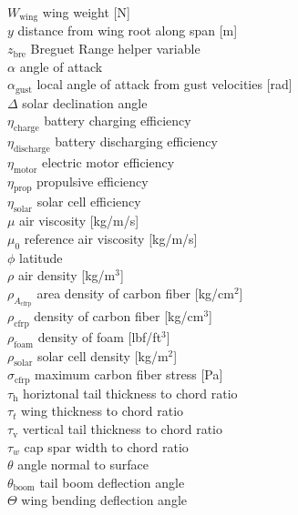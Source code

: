 \documentclass[]{aiaa-tc}%
\begin{document}
\begin{multicols}{2}
\begin{tabbing}
$W_{\text{wing}}$ \> wing weight [N] \\
$y$ \> distance from wing root along span [m] \\
$z_{\text{bre}}$ \> Breguet Range helper variable \\
$\alpha$ \> angle of attack \\
$\alpha_{\text{gust}}$ \> local angle of attack from gust velocities [rad] \\
$\Delta$ \> solar declination angle \\
$\eta_{\text{charge}}$ \> battery charging efficiency \\
$\eta_{\text{discharge}}$ \> battery discharging efficiency \\
$\eta_{\text{motor}}$ \> electric motor efficiency \\
$\eta_{\text{prop}}$ \> propulsive efficiency \\
$\eta_{\text{solar}}$ \> solar cell efficiency \\
$\mu$ \> air viscosity [kg/m/s] \\
$\mu_0$ \> reference air viscosity [kg/m/s] \\
$\phi$ \> latitude \\
$\rho$ \> air density [kg/m$^3$] \\
$\rho_{A_{\text{cfrp}}}$ \> area density of carbon fiber [kg/cm$^2$] \\
$\rho_{\text{cfrp}}$ \> density of carbon fiber [kg/cm$^3$] \\
$\rho_{\text{foam}}$ \> density of foam [lbf/ft$^3$] \\
$\rho_{\text{solar}}$ \> solar cell density [kg/m$^2$] \\
$\sigma_{\text{cfrp}}$ \> maximum carbon fiber stress [Pa] \\
$\tau_{\text{h}}$ \> horiztonal tail thickness to chord ratio \\
$\tau_t$ \> wing thickness to chord ratio \\
$\tau_{\text{v}}$ \> vertical tail thickness to chord ratio \\
$\tau_w$ \> cap spar width to chord ratio \\
$\theta$ \> angle normal to surface \\
$\theta_{\text{boom}}$ \> tail boom deflection angle \\
$\Theta$ \> wing bending deflection angle 
 \end{tabbing}

\end{multicols}
\end{document}
